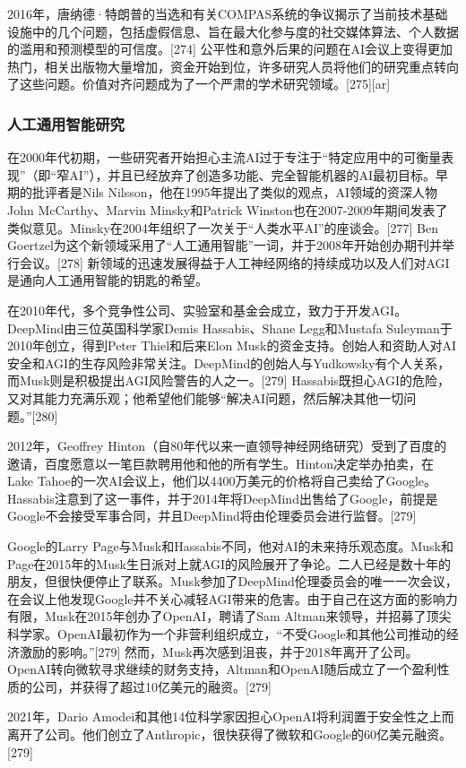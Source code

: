 2016年，唐纳德·特朗普的当选和有关COMPAS系统的争议揭示了当前技术基础设施中的几个问题，包括虚假信息、旨在最大化参与度的社交媒体算法、个人数据的滥用和预测模型的可信度。[274] 公平性和意外后果的问题在AI会议上变得更加热门，相关出版物大量增加，资金开始到位，许多研究人员将他们的研究重点转向了这些问题。价值对齐问题成为了一个严肃的学术研究领域。[275][ar]
\subsubsection{人工通用智能研究} 
在2000年代初期，一些研究者开始担心主流AI过于专注于“特定应用中的可衡量表现”（即“窄AI”），并且已经放弃了创造多功能、完全智能机器的AI最初目标。早期的批评者是Nils Nilsson，他在1995年提出了类似的观点，AI领域的资深人物John McCarthy、Marvin Minsky和Patrick Winston也在2007-2009年期间发表了类似意见。Minsky在2004年组织了一次关于“人类水平AI”的座谈会。[277] Ben Goertzel为这个新领域采用了“人工通用智能”一词，并于2008年开始创办期刊并举行会议。[278] 新领域的迅速发展得益于人工神经网络的持续成功以及人们对AGI是通向人工通用智能的钥匙的希望。

在2010年代，多个竞争性公司、实验室和基金会成立，致力于开发AGI。DeepMind由三位英国科学家Demis Hassabis、Shane Legg和Mustafa Suleyman于2010年创立，得到Peter Thiel和后来Elon Musk的资金支持。创始人和资助人对AI安全和AGI的生存风险非常关注。DeepMind的创始人与Yudkowsky有个人关系，而Musk则是积极提出AGI风险警告的人之一。[279] Hassabis既担心AGI的危险，又对其能力充满乐观；他希望他们能够“解决AI问题，然后解决其他一切问题。”[280]

2012年，Geoffrey Hinton（自80年代以来一直领导神经网络研究）受到了百度的邀请，百度愿意以一笔巨款聘用他和他的所有学生。Hinton决定举办拍卖，在Lake Tahoe的一次AI会议上，他们以4400万美元的价格将自己卖给了Google。Hassabis注意到了这一事件，并于2014年将DeepMind出售给了Google，前提是Google不会接受军事合同，并且DeepMind将由伦理委员会进行监督。[279]

Google的Larry Page与Musk和Hassabis不同，他对AI的未来持乐观态度。Musk和Page在2015年的Musk生日派对上就AGI的风险展开了争论。二人已经是数十年的朋友，但很快便停止了联系。Musk参加了DeepMind伦理委员会的唯一一次会议，在会议上他发现Google并不关心减轻AGI带来的危害。由于自己在这方面的影响力有限，Musk在2015年创办了OpenAI，聘请了Sam Altman来领导，并招募了顶尖科学家。OpenAI最初作为一个非营利组织成立，“不受Google和其他公司推动的经济激励的影响。”[279] 然而，Musk再次感到沮丧，并于2018年离开了公司。OpenAI转向微软寻求继续的财务支持，Altman和OpenAI随后成立了一个盈利性质的公司，并获得了超过10亿美元的融资。[279]

2021年，Dario Amodei和其他14位科学家因担心OpenAI将利润置于安全性之上而离开了公司。他们创立了Anthropic，很快获得了微软和Google的60亿美元融资。[279]

